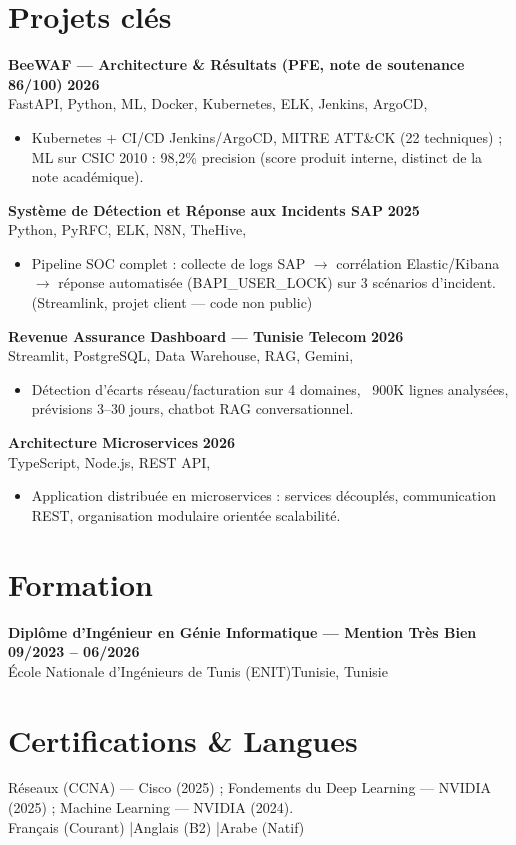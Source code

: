 \documentclass[a4paper,10pt]{article}
\newcommand{\cventry}[4]{\textbf{#1} \hfill \textbf{#4}\\[0.5pt]#2{\ifx\relax#3\relax\else, #3\fi}\par\vspace{1pt}}
\begin{document}
\section{Projets clés}
\cventry{BeeWAF --- Architecture \& Résultats (PFE, note de soutenance 86/100)}{FastAPI, Python, ML, Docker, Kubernetes, ELK, Jenkins, ArgoCD}{}{2026}
\begin{itemize}
  \item Kubernetes + CI/CD Jenkins/ArgoCD, MITRE ATT\&CK (22 techniques) ; ML sur CSIC 2010 : 98,2\% precision (score produit interne, distinct de la note académique).
\end{itemize}
\cventry{Système de Détection et Réponse aux Incidents SAP}{Python, PyRFC, ELK, N8N, TheHive}{}{2025}
\begin{itemize}
  \item Pipeline SOC complet : collecte de logs SAP $\to$ corrélation Elastic/Kibana $\to$ réponse automatisée (BAPI\_USER\_LOCK) sur 3 scénarios d'incident. (Streamlink, projet client --- code non public)
\end{itemize}
\cventry{Revenue Assurance Dashboard --- Tunisie Telecom}{Streamlit, PostgreSQL, Data Warehouse, RAG, Gemini}{}{2026}
\begin{itemize}
  \item Détection d'écarts réseau/facturation sur 4 domaines, ~900K lignes analysées, prévisions 3--30 jours, chatbot RAG conversationnel.
\end{itemize}
\cventry{Architecture Microservices}{TypeScript, Node.js, REST API}{}{2026}
\begin{itemize}
  \item Application distribuée en microservices : services découplés, communication REST, organisation modulaire orientée scalabilité.
\end{itemize}
\section{Formation}
\cventry{Diplôme d'Ingénieur en Génie Informatique --- Mention Très Bien}{École Nationale d'Ingénieurs de Tunis (ENIT)}{Tunisie}{09/2023 -- 06/2026}

\section{Certifications \& Langues}
Réseaux (CCNA) --- Cisco (2025) ; Fondements du Deep Learning --- NVIDIA (2025) ; Machine Learning --- NVIDIA (2024).\\[2pt]
Français (Courant) \quad|\quad Anglais (B2) \quad|\quad Arabe (Natif)
\end{document}
